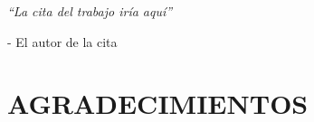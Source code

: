 \documentclass[a4paper, 11pt, spanish, twoside]{article}
\begin{document}
 




\newpage
\thispagestyle{empty}







 
\newpage
\thispagestyle{empty}

\begin{flushright} %
\vspace*{5cm} %

\textit{“La cita del trabajo iría aquí”} 

\medskip %
- El autor de la cita 

\end{flushright}

\afterpage{\blankpage} %




\newpage
\thispagestyle{plain}

\section*{AGRADECIMIENTOS} %
\end{document}
